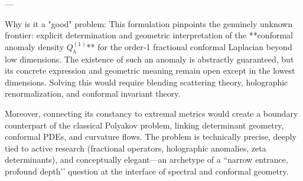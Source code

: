 ---

Why is it a "good" problem:  
This formulation pinpoints the genuinely unknown frontier: explicit determination and geometric interpretation of the **conformal anomaly density \(Q^{(1)}_h\)** for the order‑1 fractional conformal Laplacian beyond low dimensions.  
The existence of such an anomaly is abstractly guaranteed, but its concrete expression and geometric meaning remain open except in the lowest dimensions. Solving this would require blending scattering theory, holographic renormalization, and conformal invariant theory.  

Moreover, connecting its constancy to extremal metrics would create a boundary counterpart of the classical Polyakov problem, linking determinant geometry, conformal PDEs, and curvature flows. The problem is technically precise, deeply tied to active research (fractional operators, holographic anomalies, zeta determinants), and conceptually elegant—an archetype of a “narrow entrance, profound depth’’ question at the interface of spectral and conformal geometry.